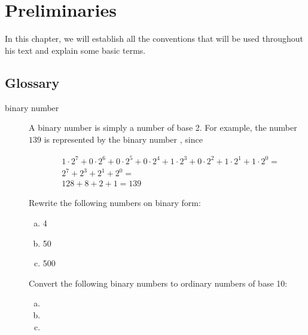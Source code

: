 \begin{comment}
  
\end{comment}

\chapter{Preliminaries}
\label{cha:preliminaries}

In this chapter, we will establish all the conventions that will be used
throughout his text and explain some basic terms.

\section{Glossary}
\label{sec:glossary}

\begin{description}
\item[binary number] A binary number is simply a number of base 2. For
  example, the number $139$ is represented by the binary number
  , since

  \begin{align*}
   & 1 \cdot 2^7 + 0 \cdot 2^6 + 0 \cdot 2^5 + 0 \cdot 2^4 + 1 \cdot 2^3
   + 0 \cdot 2^2 + 1 \cdot 2^1 + 1 \cdot 2^0 = \\
   & 2^7 + 2^3 + 2^1 + 2^0 = \\
   & 128 + 8 + 2 + 1 = 139
  \end{align*}

  \begin{Exercise}[label={n-to-bin}]
    Rewrite the following numbers on binary form:

    \begin{enumerate}[(a)]
    \item 4
    \item 50
    \item 500
    \end{enumerate}

  \end{Exercise}

  \begin{Exercise}[label={bin-to-n}]
    Convert the following binary numbers to ordinary numbers of base
    10:

    \begin{enumerate}[(a)]
    \item {}
    \item {}
    \item {}
    \end{enumerate}


\end{Exercise}
\end{description}
